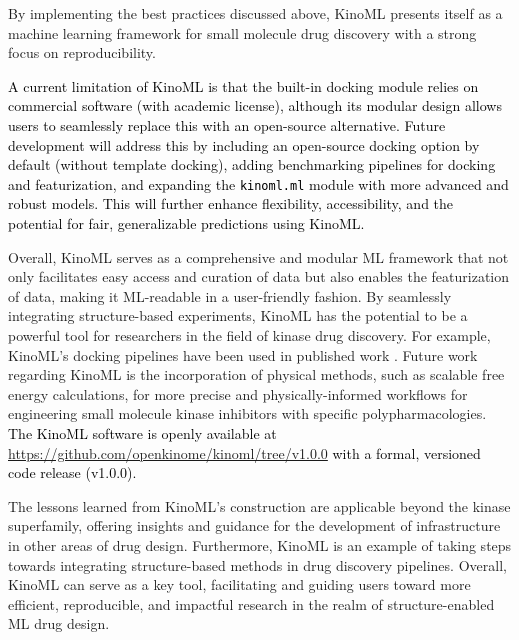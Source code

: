 \documentclass[9pt,lessons, pubversion]{livecoms}
\newcommand{\revision}[1]{\textcolor{black}{#1}}
\begin{document}
By implementing the best practices discussed above, KinoML presents itself as a machine learning framework for small molecule drug discovery with a strong focus on reproducibility.  %

\revision{A current limitation of KinoML is that the built-in docking module relies on commercial software (with academic license), although its modular design allows users to seamlessly replace this with an open-source alternative. Future development will address this by including an open-source docking option by default (without template docking), adding benchmarking pipelines for docking and featurization, and expanding the \texttt{kinoml.ml} module with more advanced and robust models. This will further enhance flexibility, accessibility, and the potential for fair, generalizable predictions using KinoML.}

Overall, KinoML serves as a comprehensive and modular ML framework that not only facilitates easy access and curation of data but also enables the featurization of data, making it ML-readable in a user-friendly fashion. By seamlessly integrating structure-based experiments, KinoML has the potential to be a powerful tool for researchers in the field of kinase drug discovery. For example, KinoML's docking pipelines have been used in published work \cite{backenkohler2023guided, schaller2023benchmarking}.  Future work regarding KinoML is the incorporation of physical methods, such as scalable free energy calculations, for more precise and physically-informed workflows for engineering small molecule kinase inhibitors with specific polypharmacologies. \revision{The KinoML software is openly available at \url{https://github.com/openkinome/kinoml/tree/v1.0.0} with a formal, versioned code release (v1.0.0).}%

The lessons learned from KinoML's construction are applicable beyond the kinase superfamily, offering insights and guidance for the development of infrastructure in other areas of drug design. Furthermore, Kino\-ML is an example of taking steps towards integrating structure-based methods in drug discovery pipelines. Overall, KinoML can serve as a key tool, facilitating and guiding users toward more efficient, reproducible, and impactful research in the realm of structure-enabled ML drug design.
\end{document}
